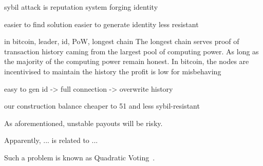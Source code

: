 

sybil attack is 
reputation system
forging identity

easier to find solution
easier to generate identity
less resistant

in bitcoin, leader, id, PoW, longest chain
The longest chain serves proof of transaction history caming from the largest pool of computing power.
As long as the majority of the computing power remain honest.
In bitcoin, the nodes are incentivised to maintain the history
the profit is low for misbehaving

easy to gen id -> full connection -> overwrite history


our construction
balance
cheaper to 51 and less sybil-resistant


As aforementioned, unstable payouts will be risky.


Apparently, 
... is related to ...

Such a problem is known as Quadratic Voting~\cite{lalley2018quadratic}.
